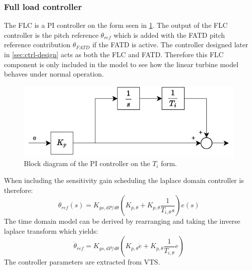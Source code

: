 \subsubsection{Full load controller} \label{sec:comp_flc}
The FLC is a PI controller on the form seen in \cref{fig:PIcontroller}. The output of the FLC controller is the pitch reference $ \theta_{ref} $ which is added with the FATD pitch reference contribution $ \theta_{FATD} $ if the FATD is active. The controller designed later in \cref{sec:ctrl-design} acts as both the FLC and FATD. Therefore this FLC component is only included in the model to see how the linear turbine model behaves under normal operation.
\begin{figure}[ht]
	\centering
	\includegraphics[width=0.5\linewidth]{Graphics/PiController.pdf}
	\caption{Block diagram of the PI controller on the \textit{$T_i$} form.}
	\label{fig:PIcontroller}
\end{figure}
When including the sensitivity gain scheduling the laplace domain controller is therefore:
\begin{equation}\label{eq:comp_flc}
	\theta_{ref}(s) = K_{gs,dP/d\theta} (K_{p, \theta} + K_{p, \theta} \dfrac{1}{T_{i, \theta} s}) e(s)
\end{equation}
The time domain model can be derived by rearranging and taking the inverse laplace transform which yields:
\begin{equation}\label{eq:comp_flc_time}
	\dot{\theta}_{ref} = K_{gs,dP/d\theta} (K_{p, \theta} \dot{e} + K_{p, \theta} \dfrac{1}{T_{i, \theta}} e)
\end{equation}
The controller parameters are extracted from VTS.

